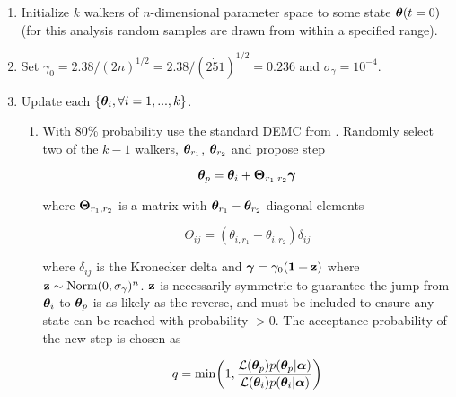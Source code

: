 \begin{enumerate}
\item Initialize $k$ walkers of $n$-dimensional parameter space to some state $\boldsymbol{\theta}(t = 0)$ (for this analysis random samples
are drawn from within a specified range).

\item Set $\gamma_0 = 2.38 / (2 n)^{1/2} = 2.38 / (2 \dot 51)^{1/2} = 0.236$ and $\sigma_{\gamma} = 10^{-4}$.

\item \label{itm:update_demc} Update each $\{\boldsymbol{\theta}_i, \forall i = 1, ..., k\}$.
\begin{enumerate}
\item \label{itm:update_demc_normal} With 80\% probability use the standard DEMC from .  Randomly
select two of the $k - 1$ walkers, $\boldsymbol{\theta}_{r_1}$, $\boldsymbol{\theta}_{r_2}$ and propose step

\vspace{-10pt}

\begin{equation}
\boldsymbol{\theta}_p = \boldsymbol{\theta}_i + \boldsymbol{\Theta}_{r_1, r_2} \boldsymbol{\gamma}
\label{eq:elifetime_fit_mcmc_update_demc}
\end{equation}

\noindent where $\boldsymbol{\Theta}_{r_1, r_2}$ is a matrix with $\boldsymbol{\theta}_{r_1} - \boldsymbol{\theta}_{r_2}$ diagonal
elements

\vspace{-10pt}

\begin{equation}
\Theta_{ij} = (\theta_{i, r_1} - \theta_{i, r_2}) \delta_{ij}
\end{equation}

\noindent where $\delta_{ij}$ is the Kronecker delta  and $\boldsymbol{\gamma} = \gamma_0 (\mathbf{1} + \mathbf{z})$ where
$\mathbf{z} \sim \mathrm{Norm}(0, \sigma_{\gamma})^n$.  $\mathbf{z}$ is necessarily symmetric to guarantee the jump from
$\boldsymbol{\theta}_i$ to $\boldsymbol{\theta}_p$ is as likely as the reverse, and must be included to ensure any state can be reached with
probability $> 0$.  The acceptance probability of the new step is chosen as

\vspace{-20pt}

\begin{equation}
q = \mathrm{min} \bigg( 1, \frac{\mathcal{L}(\boldsymbol{\theta}_p) p(\boldsymbol{\theta}_p|\boldsymbol{\alpha})}
{\mathcal{L}(\boldsymbol{\theta}_i) p(\boldsymbol{\theta}_i|\boldsymbol{\alpha})} \bigg)
\label{eq:elifetime_fit_mcmc_acc_demc}
\end{equation}


\end{enumerate}
\end{enumerate}
